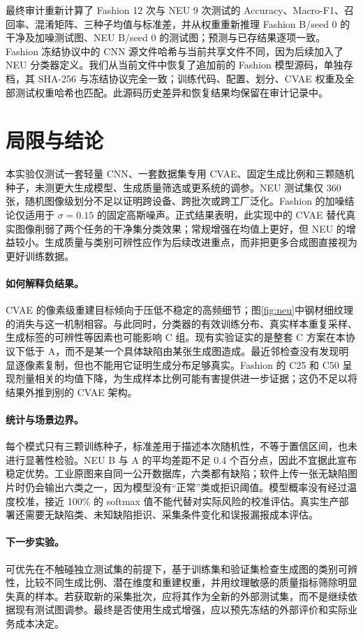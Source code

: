 \documentclass{article}
\begin{document}
最终审计重新计算了 Fashion 12 次与 NEU 9 次测试的 Accuracy、Macro-F1、召回率、混淆矩阵、三种子均值与标准差，并从权重重新推理 Fashion B/seed 0 的干净及加噪测试图、NEU B/seed 0 的测试图；预测与已存结果逐项一致。Fashion 冻结协议中的 CNN 源文件哈希与当前共享文件不同，因为后续加入了 NEU 分类器定义。我们从当前文件中恢复了追加前的 Fashion 模型源码，单独存档，其 SHA-256 与冻结协议完全一致；训练代码、配置、划分、CVAE 权重及全部测试权重哈希也匹配。此源码历史差异和恢复结果均保留在审计记录中。

\section{局限与结论}
本实验仅测试一套轻量 CNN、一套数据集专用 CVAE、固定生成比例和三颗随机种子，未测更大生成模型、生成质量筛选或更系统的调参。NEU 测试集仅 360 张，随机图像级划分不足以证明跨设备、跨批次或跨工厂泛化。Fashion 的加噪结论仅适用于 $\sigma=0.15$ 的固定高斯噪声。正式结果表明，此实现中的 CVAE 替代真实图像削弱了两个任务的干净集分类效果；常规增强在均值上更好，但 NEU 的增益较小。生成质量与类别可辨性应作为后续改进重点，而非把更多合成图直接视为更好训练数据。

\paragraph{如何解释负结果。}CVAE 的像素级重建目标倾向于压低不稳定的高频细节；图\ref{fig:neu}中钢材细纹理的消失与这一机制相容。与此同时，分类器的有效训练分布、真实样本重复采样、生成标签的可辨性等因素也可能影响 C 组。现有实验证实的是整套 C 方案在本协议下低于 A，而不是某一个具体缺陷由某张生成图造成。最近邻检查没有发现明显逐像素复制，但也不能用它证明生成分布足够真实。Fashion 的 C25 和 C50 呈现剂量相关的均值下降，为生成样本比例可能有害提供进一步证据；这仍不足以将结果外推到别的 CVAE 架构。

\paragraph{统计与场景边界。}每个模式只有三颗训练种子，标准差用于描述本次随机性，不等于置信区间，也未进行显著性检验。NEU B 与 A 的平均差距不足 0.4 个百分点，因此不宜据此宣布稳定优势。工业原图来自同一公开数据库，六类都有缺陷；软件上传一张无缺陷图片时仍会输出六类之一，因为模型没有“正常”类或拒识阈值。模型概率没有经过温度校准，接近 100\% 的 softmax 值不能代替对实际风险的校准评估。真实生产部署还需要无缺陷类、未知缺陷拒识、采集条件变化和误报漏报成本评估。

\paragraph{下一步实验。}可优先在不触碰独立测试集的前提下，基于训练集和验证集检查生成图的类别可辨性，比较不同生成比例、潜在维度和重建权重，并用纹理敏感的质量指标筛除明显失真的样本。若获取新的采集批次，应将其作为全新的外部测试集，而不是继续依据现有测试图调参。最终是否使用生成式增强，应以预先冻结的外部评价和实际业务成本决定。
\end{document}
